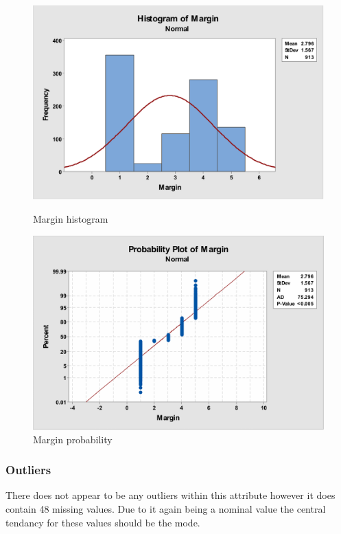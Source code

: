 \documentclass[12pt]{article}
\begin{document}
        \begin{figure}[H]
          \centering
          \begin{minipage}[b]{0.45\textwidth}
            \includegraphics[width=\textwidth]{margin-histogram}
            \caption{Margin histogram}
            \label{fig:margin-histogram}
          \end{minipage}
          \hfill
          \begin{minipage}[b]{0.45\textwidth}
            \includegraphics[width=\textwidth]{margin-probability}
            \caption{Margin probability}
            \label{fig:margin-probability}
          \end{minipage}
        \end{figure}

      \subsubsection{Outliers}
        There does not appear to be any outliers within this attribute however it does contain 48 missing values. Due to it again being a nominal value the central tendancy for these values should be the mode.
\end{document}
